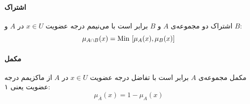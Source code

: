 \paragraph{ اشتراک}
اشتراک دو مجموعه‌ی $A$ و $B$ برابر است با می‌نیمم درجه عضویت $x \in U$ در $A$ و $B$:
 \begin{equation}\label{eq:e_fset_op_intersect}
 \mu_{A \cap B}(x) = {\rm Min}\ [\mu_{A}(x), \mu_{B}(x)]
 \end{equation}
 \paragraph{ مکمل}
 مکمل مجموعه‌ی $A$ برابر است با تفاضل درجه عضویت $x \in U$ در $A$ از ماکزیمم درجه عضویت یعنی ۱:
 \begin{equation}\label{eq:e_fset_op_complement}
 \mu_{\overline{A}}(x) = 1- \mu_{A}(x)
 \end{equation}
